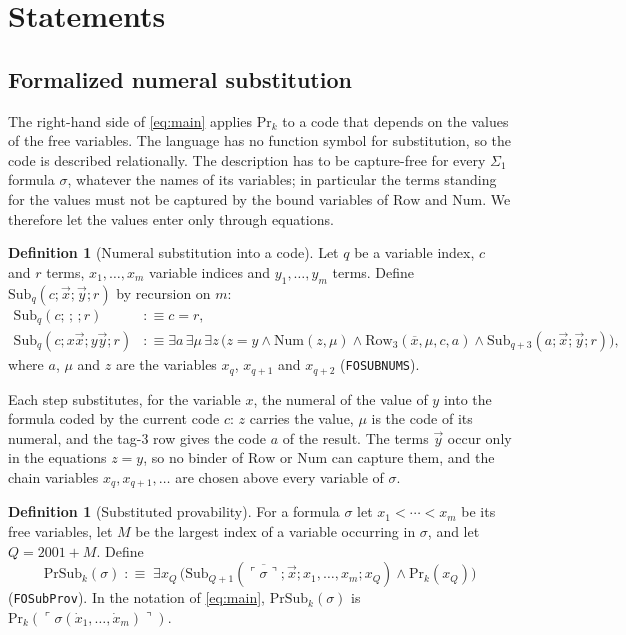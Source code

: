 \documentclass[11pt]{article}
\theoremstyle{plain}
\theoremstyle{definition}
\newtheorem{definition}[theorem]{Definition}
\theoremstyle{remark}
\newcommand{\Prv}{\mathrm{Pr}}
\newcommand{\gn}[1]{\ulcorner #1 \urcorner}
\newcommand{\num}[1]{\overline{#1}}
\newcommand{\Sub}{\mathrm{Sub}}
\newcommand{\PSub}{\mathrm{PrSub}}
\newcommand{\Row}{\mathrm{Row}}
\newcommand{\Num}{\mathrm{Num}}
\newcommand{\rocq}[1]{\texttt{#1}}
\begin{document}
\section{Statements}\label{sec:statement}

\subsection{Formalized numeral substitution}

The right-hand side of \eqref{eq:main} applies $\Prv_k$ to a code that
depends on the values of the free variables.  The language has no
function symbol for substitution, so the code is described relationally.
The description has to be capture-free for every $\Sigma_1$ formula
$\sigma$, whatever the names of its variables; in particular the terms
standing for the values must not be captured by the bound variables of
$\Row$ and $\Num$.  We therefore let the values enter only through
equations.

\begin{definition}[Numeral substitution into a code]\label{def:sub}
Let $q$ be a variable index, $c$ and $r$ terms, $x_1,\dots,x_m$ variable
indices and $y_1,\dots,y_m$ terms.  Define $\Sub_q(c; \vec x; \vec y; r)$
by recursion on $m$:
\begin{align*}
  \Sub_q(c;\,;\,; r) &:\equiv c = r,\\
  \Sub_q(c; x\vec x; y\vec y; r) &:\equiv
    \exists a\, \exists \mu\, \exists z\, \bigl(
      z = y \wedge \Num(z,\mu) \wedge \Row_3(\num{x}, \mu, c, a) \wedge
      \Sub_{q+3}(a; \vec x; \vec y; r) \bigr),
\end{align*}
where $a$, $\mu$ and $z$ are the variables $x_q$, $x_{q+1}$ and
$x_{q+2}$ (\rocq{FOSUBNUMS}).
\end{definition}

Each step substitutes, for the variable $x$, the numeral of the value of
$y$ into the formula coded by the current code $c$: $z$ carries the
value, $\mu$ is the code of its numeral, and the tag-3 row gives the
code $a$ of the result.  The terms $\vec y$ occur only in the equations
$z = y$, so no binder of $\Row$ or $\Num$ can capture them, and the
chain variables $x_q, x_{q+1},\ldots$ are chosen above every variable of
$\sigma$.

\begin{definition}[Substituted provability]\label{def:psub}
For a formula $\sigma$ let $x_1 < \cdots < x_m$ be its free variables,
let $M$ be the largest index of a variable occurring in $\sigma$, and
let $Q = 2001 + M$.  Define
\[
  \PSub_k(\sigma) \;:\equiv\; \exists x_Q\,\bigl(
    \Sub_{Q+1}(\num{\gn{\sigma}}; \vec x; x_1,\dots,x_m; x_Q) \wedge
    \Prv_k(x_Q) \bigr)
\]
(\rocq{FOSubProv}).  In the notation of \eqref{eq:main},
$\PSub_k(\sigma)$ is $\Prv_k(\gn{\sigma(\dot x_1,\dots,\dot x_m)})$.
\end{definition}
\end{document}
